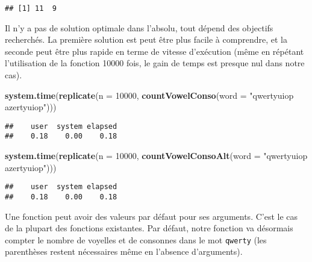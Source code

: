 \documentclass[]{book}
\newenvironment{Shaded}{\begin{snugshade}}{\end{snugshade}}
\newcommand{\KeywordTok}[1]{\textcolor[rgb]{0.13,0.29,0.53}{\textbf{#1}}}
\newcommand{\DataTypeTok}[1]{\textcolor[rgb]{0.13,0.29,0.53}{#1}}
\newcommand{\DecValTok}[1]{\textcolor[rgb]{0.00,0.00,0.81}{#1}}
\newcommand{\StringTok}[1]{\textcolor[rgb]{0.31,0.60,0.02}{#1}}
\newcommand{\NormalTok}[1]{#1}
\theoremstyle{definition}
\theoremstyle{definition}
\theoremstyle{definition}
\theoremstyle{remark}
\begin{document}
\begin{verbatim}
## [1] 11  9
\end{verbatim}

Il n'y a pas de solution optimale dans l'absolu, tout dépend des
objectifs recherchés. La première solution est peut être plus facile à
comprendre, et la seconde peut être plus rapide en terme de vitesse
d'exécution (même en répétant l'utilisation de la fonction 10000 fois,
le gain de temps est presque nul dans notre cas).

\begin{Shaded}
\begin{Highlighting}[]
\KeywordTok{system.time}\NormalTok{(}\KeywordTok{replicate}\NormalTok{(}\DataTypeTok{n =} \DecValTok{10000}\NormalTok{, }\KeywordTok{countVowelConso}\NormalTok{(}\DataTypeTok{word =} \StringTok{"qwertyuiop azertyuiop"}\NormalTok{)))}
\end{Highlighting}
\end{Shaded}

\begin{verbatim}
##    user  system elapsed 
##    0.18    0.00    0.18
\end{verbatim}

\begin{Shaded}
\begin{Highlighting}[]
\KeywordTok{system.time}\NormalTok{(}\KeywordTok{replicate}\NormalTok{(}\DataTypeTok{n =} \DecValTok{10000}\NormalTok{, }\KeywordTok{countVowelConsoAlt}\NormalTok{(}\DataTypeTok{word =} \StringTok{"qwertyuiop azertyuiop"}\NormalTok{)))}
\end{Highlighting}
\end{Shaded}

\begin{verbatim}
##    user  system elapsed 
##    0.18    0.00    0.18
\end{verbatim}

Une fonction peut avoir des valeurs par défaut pour ses arguments. C'est
le cas de la plupart des fonctions existantes. Par défaut, notre
fonction va désormais compter le nombre de voyelles et de consonnes dans
le mot \texttt{qwerty} (les parenthèses restent nécessaires même en
l'absence d'arguments).
\end{document}
